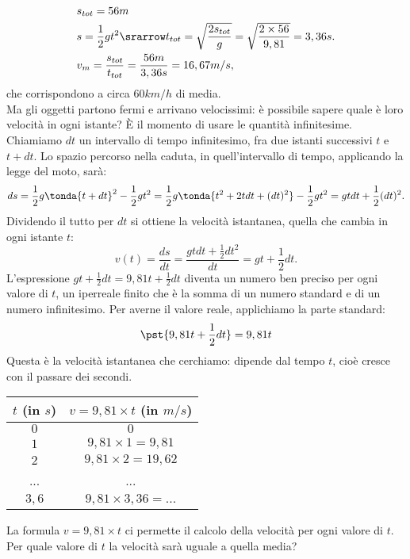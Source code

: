 \begin{align*}
 & s_{tot} = 56m\\
 & s =\frac{1}{2}gt^2 \srarrow t_{tot}= \sqrt{\frac{2s_{tot}}{g}}=
 \sqrt{\frac{2\times 56}{9,81}}=3,36 s.\\
 & v_m= \frac{s_{tot}}{t_{tot}}=\frac{56 m}{3,36 s}=16,67 m/s,
\end{align*}
che corrispondono a circa $60 km/h$ di media.\\
Ma gli oggetti partono fermi e arrivano velocissimi: 
è possibile sapere quale è loro velocità in ogni istante? È il momento
di usare le quantità infinitesime.\\
Chiamiamo $dt$ un intervallo di tempo infinitesimo, fra due istanti successivi
$t$ e $t+dt$.
Lo spazio percorso nella caduta, in quell'intervallo di tempo, applicando la 
legge del 
moto, sarà:
\[
 ds=\frac{1}{2}g\tonda{t+dt}^2-\frac{1}{2}gt^2=
 \frac{1}{2}g\tonda{t^2+2tdt+(dt)^2}-\frac{1}{2}gt^2=
 gtdt+\frac{1}{2}(dt)^2. 
\]
Dividendo il tutto per $dt$ si ottiene la velocità istantanea, quella che 
cambia
in ogni istante $t$:
\[
 v(t)=\frac{ds}{dt}=\frac{gtdt+\frac{1}{2}dt^2}{dt}=gt+\frac{1}{2}dt.
\]
L'espressione $gt+\frac{1}{2}dt=9,81t+\frac{1}{2}dt$ diventa un numero ben
preciso per ogni valore di $t$, un iperreale finito che è la
somma di un numero standard e di un numero infinitesimo. 
Per averne il valore reale, applichiamo la parte standard:
\[
 \pst{9,81t+\frac{1}{2}dt}=9,81t
\]
Questa è la velocità istantanea che cerchiamo: dipende dal tempo $t$,
cioè cresce con il passare dei secondi. 

\begin{center}
\begin{tabular}{cc}\toprule
$t$ (in $s$) & $v=9,81\times t$ (in $m/s$) \\\midrule
$0$ & $0$  \\
$1$ & $9,81\times 1 =9,81$ \\
$2$ & $9,81\times 2 =19,62$ \\
... & ... \\
$3,6$ & $9,81\times 3,36= ...$\\\bottomrule
\end{tabular}
\label{tab:diff_velocita}
\end{center}

La formula $v=9,81\times t$ ci permette il calcolo della velocità per ogni 
valore di $t$.
Per quale valore di \(t\) la velocità sarà uguale a quella media? 


